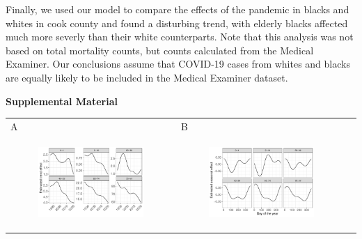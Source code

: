 \documentclass[11pt]{article}
\begin{document}
Finally, we used our model to compare the effects of the pandemic in blacks and whites in cook county and found a disturbing trend, with elderly blacks affected much more severly than their white counterparts. Note that this analysis was not based on total mortality counts, but counts calculated from the Medical Examiner. Our conclusions assume that COVID-19 cases from whites and blacks are equally likely to be included in the Medical Examiner dataset. 




\newpage
\begin{center}
\LARGE{\textbf{Supplemental Material}}
\end{center}

\begin{suppfigure}[ht]
	\begin{tabular}{lll}
	A&B\\
	\begin{subfigure}[t]{0.49\linewidth}
		\centering
		\includegraphics[width=1\linewidth]{figs/supp-figure-1a.pdf} 
	\end{subfigure}&
	\begin{subfigure}[t]{0.49\linewidth}
		\centering
		\includegraphics[width=1\linewidth]{figs/supp-figure-1b.pdf}

\end{subfigure}
\end{tabular}
\end{suppfigure}
\end{document}
